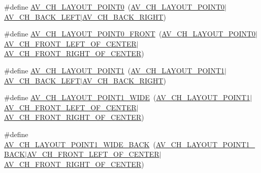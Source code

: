 \begin{DoxyCompactItemize}
\#define \hyperlink{group__channel__mask__c_gab843d4e87bc747c7a81f082589023f98}{A\+V\+\_\+\+C\+H\+\_\+\+L\+A\+Y\+O\+U\+T\+\_\+P\+O\+I\+N\+T0}~(\hyperlink{group__channel__mask__c_ga10eddec555bcf849efce5158b0cbdb50}{A\+V\+\_\+\+C\+H\+\_\+\+L\+A\+Y\+O\+U\+T\+\_\+P\+O\+I\+N\+T0}$\vert$\hyperlink{group__channel__masks_gaa3cae8c6d0eaab3dc3ce178f6af81ae2}{A\+V\+\_\+\+C\+H\+\_\+\+B\+A\+C\+K\+\_\+\+L\+E\+FT}$\vert$\hyperlink{group__channel__masks_ga7a7ab3bb418bf9672dcdf6554346e5eb}{A\+V\+\_\+\+C\+H\+\_\+\+B\+A\+C\+K\+\_\+\+R\+I\+G\+HT})
\item 
\#define \hyperlink{group__channel__mask__c_gaa4c21d7abb460730295f99c7f0098259}{A\+V\+\_\+\+C\+H\+\_\+\+L\+A\+Y\+O\+U\+T\+\_\+P\+O\+I\+N\+T0\+\_\+\+F\+R\+O\+NT}~(\hyperlink{group__channel__mask__c_ga10eddec555bcf849efce5158b0cbdb50}{A\+V\+\_\+\+C\+H\+\_\+\+L\+A\+Y\+O\+U\+T\+\_\+P\+O\+I\+N\+T0}$\vert$\hyperlink{group__channel__masks_ga6c9ea2ea60044bfe844174300b237386}{A\+V\+\_\+\+C\+H\+\_\+\+F\+R\+O\+N\+T\+\_\+\+L\+E\+F\+T\+\_\+\+O\+F\+\_\+\+C\+E\+N\+T\+ER}$\vert$\hyperlink{group__channel__masks_ga558dc25b0ce327d2547d3cc9e4bd6a4e}{A\+V\+\_\+\+C\+H\+\_\+\+F\+R\+O\+N\+T\+\_\+\+R\+I\+G\+H\+T\+\_\+\+O\+F\+\_\+\+C\+E\+N\+T\+ER})
\item 
\#define \hyperlink{group__channel__mask__c_ga2006ce652a95bad74291db52fa346464}{A\+V\+\_\+\+C\+H\+\_\+\+L\+A\+Y\+O\+U\+T\+\_\+P\+O\+I\+N\+T1}~(\hyperlink{group__channel__mask__c_gac36a042dc21866f9043ce930f300d0df}{A\+V\+\_\+\+C\+H\+\_\+\+L\+A\+Y\+O\+U\+T\+\_\+P\+O\+I\+N\+T1}$\vert$\hyperlink{group__channel__masks_gaa3cae8c6d0eaab3dc3ce178f6af81ae2}{A\+V\+\_\+\+C\+H\+\_\+\+B\+A\+C\+K\+\_\+\+L\+E\+FT}$\vert$\hyperlink{group__channel__masks_ga7a7ab3bb418bf9672dcdf6554346e5eb}{A\+V\+\_\+\+C\+H\+\_\+\+B\+A\+C\+K\+\_\+\+R\+I\+G\+HT})
\item 
\#define \hyperlink{group__channel__mask__c_ga883478469aa86f5c3f57ce864a12745b}{A\+V\+\_\+\+C\+H\+\_\+\+L\+A\+Y\+O\+U\+T\+\_\+P\+O\+I\+N\+T1\+\_\+\+W\+I\+DE}~(\hyperlink{group__channel__mask__c_gac36a042dc21866f9043ce930f300d0df}{A\+V\+\_\+\+C\+H\+\_\+\+L\+A\+Y\+O\+U\+T\+\_\+P\+O\+I\+N\+T1}$\vert$\hyperlink{group__channel__masks_ga6c9ea2ea60044bfe844174300b237386}{A\+V\+\_\+\+C\+H\+\_\+\+F\+R\+O\+N\+T\+\_\+\+L\+E\+F\+T\+\_\+\+O\+F\+\_\+\+C\+E\+N\+T\+ER}$\vert$\hyperlink{group__channel__masks_ga558dc25b0ce327d2547d3cc9e4bd6a4e}{A\+V\+\_\+\+C\+H\+\_\+\+F\+R\+O\+N\+T\+\_\+\+R\+I\+G\+H\+T\+\_\+\+O\+F\+\_\+\+C\+E\+N\+T\+ER})
\item 
\#define \hyperlink{group__channel__mask__c_ga9702d40a7d1f6e2b00e02d8ecb83bd63}{A\+V\+\_\+\+C\+H\+\_\+\+L\+A\+Y\+O\+U\+T\+\_\+P\+O\+I\+N\+T1\+\_\+\+W\+I\+D\+E\+\_\+\+B\+A\+CK}~(\hyperlink{group__channel__mask__c_gae9da5d6069701241a22f3af19b152662}{A\+V\+\_\+\+C\+H\+\_\+\+L\+A\+Y\+O\+U\+T\+\_\+P\+O\+I\+N\+T1\+\_\+\+B\+A\+CK}$\vert$\hyperlink{group__channel__masks_ga6c9ea2ea60044bfe844174300b237386}{A\+V\+\_\+\+C\+H\+\_\+\+F\+R\+O\+N\+T\+\_\+\+L\+E\+F\+T\+\_\+\+O\+F\+\_\+\+C\+E\+N\+T\+ER}$\vert$\hyperlink{group__channel__masks_ga558dc25b0ce327d2547d3cc9e4bd6a4e}{A\+V\+\_\+\+C\+H\+\_\+\+F\+R\+O\+N\+T\+\_\+\+R\+I\+G\+H\+T\+\_\+\+O\+F\+\_\+\+C\+E\+N\+T\+ER})

\end{DoxyCompactItemize}
